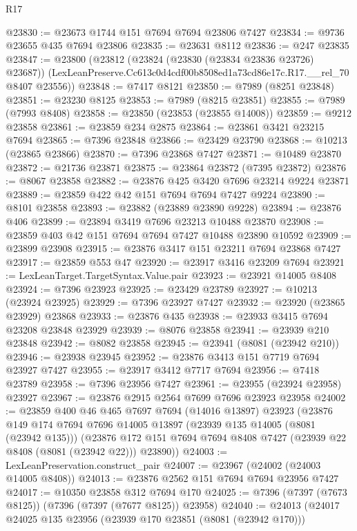 \begin{lexlean}{R17}
\begin{coremodule}
@23830 := @23673 @1744 @151 @7694 @7694 @23806 @7427
@23834 := @9736 @23655 @435 @7694 @23806
@23835 := @23631 @8112
@23836 := @247 @23835
@23847 := @23800
    (@23812
      (@23824 (@23830 (@23834 @23836 @23726) @23687))
      (LexLeanPreserve.Cc613c0d4cdf00b8508ed1a73cd86e17c.R17.__rel_70 @8407 @23556))
@23848 := @7417 @8121
@23850 := @7989 (@8251 @23848)
@23851 := @23230 @8125
@23853 := @7989 (@8215 @23851)
@23855 := @7989 (@7993 @8408)
@23858 := @23850 (@23853 (@23855 @14008))
@23859 := @9212 @23858
@23861 := @23859 @234 @2875
@23864 := @23861 @3421 @23215 @7694
@23865 := @7396 @23848
@23866 := @23429 @23790
@23868 := @10213 (@23865 @23866)
@23870 := @7396 @23868 @7427
@23871 := @10489 @23870
@23872 := @21736 @23871
@23875 := @23864 @23872 (@7395 @23872)
@23876 := @8067 @23858
@23882 := @23876 @425 @3420 @7696 @23214 @9224 @23871
@23889 := @23859 @422 @42 @151 @7694 @7694 @7427 @9224
@23890 := @8101 @23858
@23893 := @23882 (@23889 @23890 @9228)
@23894 := @23876 @406
@23899 := @23894 @3419 @7696 @23213 @10488 @23870
@23908 := @23859 @403 @42 @151 @7694 @7694 @7427 @10488 @23890 @10592
@23909 := @23899 @23908
@23915 := @23876 @3417 @151 @23211 @7694 @23868 @7427
@23917 := @23859 @553 @47
@23920 := @23917 @3416 @23209 @7694
@23921 := LexLeanTarget.TargetSyntax.Value.pair
@23923 := @23921 @14005 @8408
@23924 := @7396 @23923
@23925 := @23429 @23789
@23927 := @10213 (@23924 @23925)
@23929 := @7396 @23927 @7427
@23932 := @23920 (@23865 @23929) @23868
@23933 := @23876 @435
@23938 := @23933 @3415 @7694 @23208 @23848 @23929
@23939 := @8076 @23858
@23941 := @23939 @210 @23848
@23942 := @8082 @23858
@23945 := @23941 (@8081 (@23942 @210))
@23946 := @23938 @23945
@23952 := @23876 @3413 @151 @7719 @7694 @23927 @7427
@23955 := @23917 @3412 @7717 @7694
@23956 := @7418 @23789
@23958 := @7396 @23956 @7427
@23961 := @23955 (@23924 @23958) @23927
@23967 := @23876 @2915 @2564 @7699 @7696 @23923 @23958
@24002 := @23859
    @400
    @46
    @465
    @7697
    @7694
    (@14016 @13897)
    @23923
    (@23876
      @149
      @174
      @7694
      @7696
      @14005
      @13897
      (@23939 @135 @14005 (@8081 (@23942 @135)))
      (@23876 @172 @151 @7694 @7694 @8408 @7427 (@23939 @22 @8408 (@8081 (@23942 @22))) @23890))
@24003 := LexLeanPreservation.construct_pair
@24007 := @23967 (@24002 (@24003 @14005 @8408))
@24013 := @23876 @2562 @151 @7694 @7694 @23956 @7427
@24017 := @10350 @23858 @312 @7694 @170
@24025 := @7396 (@7397 (@7673 @8125)) (@7396 (@7397 (@7677 @8125)) @23958)
@24040 := @24013
    (@24017
      @24025
      @135
      @23956
      (@23939 @170 @23851 (@8081 (@23942 @170)))

\end{coremodule}
\end{lexlean}
